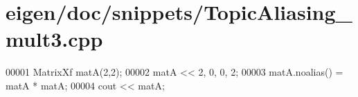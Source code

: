 \hypertarget{eigen_2doc_2snippets_2_topic_aliasing__mult3_8cpp_source}{}\section{eigen/doc/snippets/\+Topic\+Aliasing\+\_\+mult3.cpp}
\label{eigen_2doc_2snippets_2_topic_aliasing__mult3_8cpp_source}

\begin{DoxyCode}
00001 MatrixXf matA(2,2); 
00002 matA << 2, 0,  0, 2;
00003 matA.noalias() = matA * matA;
00004 cout << matA;
\end{DoxyCode}
